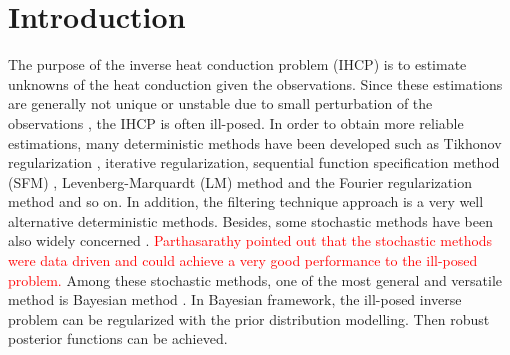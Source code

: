 \documentclass[review]{elsarticle}
\begin{document}
\section{Introduction}

The purpose of the inverse heat conduction problem (IHCP) is to estimate unknowns of the heat conduction given the observations. Since these estimations are generally not unique or unstable due to small perturbation of the observations \cite{murio2011mollification, wang2004bayesian}, the IHCP is often ill-posed. In order to obtain more reliable estimations, many deterministic methods have been developed such as Tikhonov regularization \cite{tikhonov2013numerical,bozzoli2014estimation,okamoto2007regularization, yang2010method, alifanov2012inverse, woodbury2013estimation}, iterative regularization\cite{alifanov2012inverse}, sequential function specification method (SFM) \cite{alifanov2012inverse, cabeza2005sequential, chantasiriwan2001algorithm}, Levenberg-Marquardt (LM) method \cite{rouquette2007estimation} and the Fourier regularization method \cite{mierzwiczak2010application, dou2009optimal} and so on. In addition, the filtering technique approach\cite{bozzoli2013experimental, bozzoli2011comparative} is a very well alternative deterministic methods. Besides, some stochastic methods have been also widely concerned \cite{wang2004bayesian,wang2005using, liu2008bayesian, parthasarathy2008estimation, massard2012estimation}. \textcolor{red}{Parthasarathy \cite{parthasarathy2008estimation} pointed out that the stochastic methods were data driven and could achieve a very good performance to the ill-posed problem.}  Among these stochastic methods, one of the most general and versatile method is Bayesian method \cite{wang2004bayesian,wang2005using, liu2008bayesian, parthasarathy2008estimation}. In Bayesian framework, the ill-posed inverse problem can be regularized with the prior distribution modelling. Then robust posterior functions can be achieved. 
\end{document}

